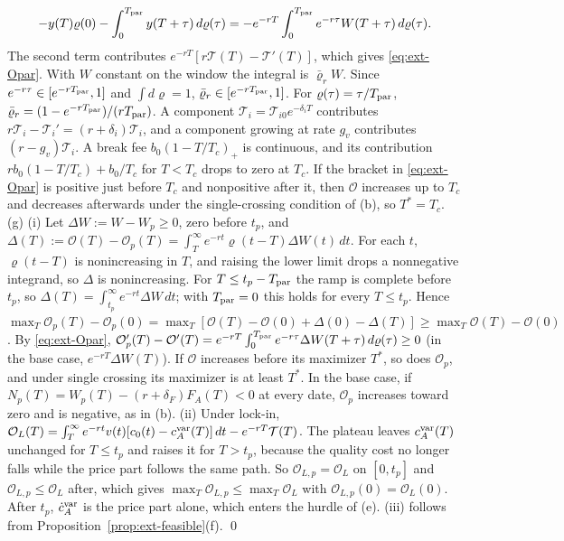 \[
-y(T)\varrho(0)-\int_0^{T_{\rm par}}y(T+\tau)\,d\varrho(\tau)=-e^{-rT}\int_0^{T_{\rm par}}e^{-r\tau}W(T+\tau)\,d\varrho(\tau).
\] The second term contributes $e^{-rT}[r\mathcal T(T)-\mathcal T'(T)]$, which gives \eqref{eq:ext-Opar}. With $W$ constant on the window the integral is $\bar\varrho_rW$. Since $e^{-r\tau}\in[e^{-rT_{\rm par}},1]$ and $\int d\varrho=1$, $\bar\varrho_r\in[e^{-rT_{\rm par}},1]$. For $\varrho(\tau)=\tau/T_{\rm par}$, $\bar\varrho_r=(1-e^{-rT_{\rm par}})/(rT_{\rm par})$. A component $\mathcal T_i=\mathcal T_{i0}e^{-\delta_iT}$ contributes $r\mathcal T_i-\mathcal T_i'=(r+\delta_i)\mathcal T_i$, and a component growing at rate $g_v$ contributes $(r-g_v)\mathcal T_i$. A break fee $b_0(1-T/T_c)_+$ is continuous, and its contribution $rb_0(1-T/T_c)+b_0/T_c$ for $T<T_c$ drops to zero at $T_c$. If the bracket in \eqref{eq:ext-Opar} is positive just before $T_c$ and nonpositive after it, then $\mathcal O$ increases up to $T_c$ and decreases afterwards under the single-crossing condition of (b), so $T^*=T_c$. (g) (i) Let $\Delta W:=W-W_p\ge0$, zero before $t_p$, and $\Delta(T):=\mathcal O(T)-\mathcal O_p(T)=\int_T^\infty e^{-rt}\varrho(t-T)\Delta W(t)\,dt$. For each $t$, $\varrho(t-T)$ is nonincreasing in $T$, and raising the lower limit drops a nonnegative integrand, so $\Delta$ is nonincreasing. For $T\le t_p-T_{\rm par}$ the ramp is complete before $t_p$, so $\Delta(T)=\int_{t_p}^\infty e^{-rt}\Delta W\,dt$; with $T_{\rm par}=0$ this holds for every $T\le t_p$. Hence $\max_T\mathcal O_p(T)-\mathcal O_p(0)=\max_T[\mathcal O(T)-\mathcal O(0)+\Delta(0)-\Delta(T)]\ge\max_T\mathcal O(T)-\mathcal O(0)$. By \eqref{eq:ext-Opar}, $\mathcal O_p'(T)-\mathcal O'(T)=e^{-rT}\int_0^{T_{\rm par}}e^{-r\tau}\Delta W(T+\tau)\,d\varrho(\tau)\ge0$ (in the base case, $e^{-rT}\Delta W(T)$). If $\mathcal O$ increases before its maximizer $T^*$, so does $\mathcal O_p$, and under single crossing its maximizer is at least $T^*$. In the base case, if $N_p(T)=W_p(T)-(r+\delta_F)F_A(T)<0$ at every date, $\mathcal O_p$ increases toward zero and is negative, as in (b). (ii) Under lock-in, $\mathcal O_L(T)=\int_T^\infty e^{-rt}v(t)[c_0(t)-c^{\rm var}_A(T)]\,dt-e^{-rT}\mathcal T(T)$. The plateau leaves $c^{\rm var}_A(T)$ unchanged for $T\le t_p$ and raises it for $T>t_p$, because the quality cost no longer falls while the price part follows the same path. So $\mathcal O_{L,p}=\mathcal O_L$ on $[0,t_p]$ and $\mathcal O_{L,p}\le\mathcal O_L$ after, which gives $\max_T\mathcal O_{L,p}\le\max_T\mathcal O_L$ with $\mathcal O_{L,p}(0)=\mathcal O_L(0)$. After $t_p$, $\dot c^{\rm var}_A$ is the price part alone, which enters the hurdle of (e). (iii) follows from Proposition~\ref{prop:ext-feasible}(f). \qed

